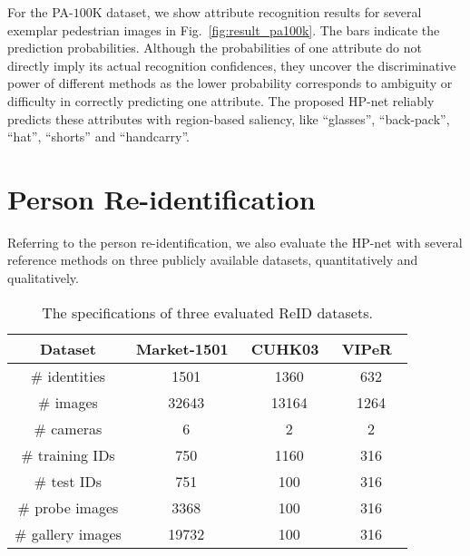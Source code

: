 \documentclass[10pt,twocolumn,letterpaper]{article}
\begin{document}
For the PA-$100$K dataset, we show attribute recognition results for several exemplar pedestrian images in Fig.~\ref{fig:result_pa100k}.
The bars indicate the prediction probabilities.
Although the probabilities of one attribute do not directly imply its actual recognition confidences, they uncover the discriminative power of different methods as the lower probability corresponds to ambiguity or difficulty in correctly predicting one attribute.
The proposed HP-net reliably predicts these attributes with region-based saliency, like ``glasses'', ``back-pack'', ``hat'', ``shorts'' and ``handcarry''.







\section{Person Re-identification}
\label{sec:exp_reid}

Referring to the person re-identification,
we also evaluate the HP-net with several reference methods on three publicly available datasets, quantitatively and qualitatively.

\begin{table}
\begin{center}
\begin{footnotesize}
\begin{tabular}{c|ccc}
\hline
Dataset & Market-1501~\cite{zheng2015scalable} & CUHK03~\cite{li2014deepreid} & VIPeR~\cite{gray2007evaluating} \\\hline
\# identities & 1501 & 1360 & 632\\
\# images & 32643 & 13164 & 1264\\
\# cameras & 6 & 2 & 2\\\hline
\# training IDs & 750 & 1160 & 316\\\hline
\# test IDs & 751 & 100 & 316\\
\# probe images & 3368 & 100 & 316\\
\# gallery images & 19732 & 100 & 316\\\hline
\end{tabular}
\end{footnotesize}
\caption{The specifications of three evaluated ReID datasets.}
\label{tab:datasets}
\vspace{-0.3cm}
\end{center}
\end{table}
\end{document}
